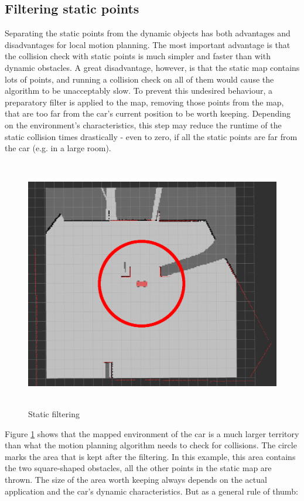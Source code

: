 \subsection{Filtering static points}
Separating the static points from the dynamic objects has both advantages and disadvantages for local motion planning. The most important advantage is that the collision check with static points is much simpler and faster than with dynamic obstacles. A great disadvantage, however, is that the static map contains lots of points, and running a collision check on all of them would cause the algorithm to be unacceptably slow. To prevent this undesired behaviour, a preparatory filter is applied to the map, removing those points from the map, that are too far from the car's current position to be worth keeping. Depending on the environment's characteristics, this step may reduce the runtime of the static collision times drastically - even to zero, if all the static points are far from the car (e.g. in a large room).

\begin{figure}[!ht]
    \centering
    \includegraphics[height=110mm]{figures/raw/rviz_2_near_static_objects_filter.png}
    \caption{Static filtering}
    \label{rviz_2_near_static_objects_filter}
\end{figure}

Figure \ref{rviz_2_near_static_objects_filter} shows that the mapped environment of the car is a much larger territory than what the motion planning algorithm needs to check for collisions. The circle marks the area that is kept after the filtering. In this example, this area contains the two square-shaped obstacles, all the other points in the static map are thrown. The size of the area worth keeping always depends on the actual application and the car's dynamic characteristics. But as a general rule of thumb:

